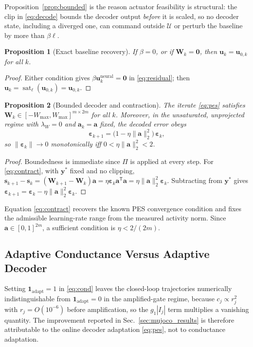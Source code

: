 \documentclass[letterpaper,10pt,conference]{IEEEtran}
\newcommand{\T}{^{\mathsf T}}
\newcommand{\sat}{\operatorname{sat}}
\newtheorem{proposition}{Proposition}
\begin{document}
Proposition~\ref{prop:bounded} is the reason actuator feasibility is
structural: the clip in \eqref{eq:decode} bounds the decoder output
\emph{before} it is scaled, so no decoder state, including a diverged one,
can command outside $\mathcal U$ or perturb the baseline by more than
$\beta\bm\ell$.

\begin{proposition}[Exact baseline recovery]
\label{prop:recovery}
If $\beta=0$, or if $\bm W_k=\bm 0$, then $\bm u_k=\bm u_{0,k}$ for all
$k$.
\end{proposition}
\begin{proof}
Either condition gives $\beta\bm u^{\mathrm{neural}}_k=\bm 0$ in
\eqref{eq:residual}; then $\bm u_k=\sat_{\bm\ell}(\bm u_{0,k})=\bm u_{0,k}$.
\end{proof}

\begin{proposition}[Bounded decoder and contraction]
\label{prop:pes}
The iterate \eqref{eq:pes} satisfies
$\bm W_k\in[-W_{\max},W_{\max}]^{m\times2m}$ for all $k$. Moreover, in the
unsaturated, unprojected regime with $\lambda_W=0$ and $\bm a_k=\bm a$
fixed, the decoded error obeys
\begin{equation}
    \bm\varepsilon_{k+1}
    =\big(1-\eta\|\bm a\|_2^{2}\big)\,\bm\varepsilon_k ,
    \label{eq:contract}
\end{equation}
so $\|\bm\varepsilon_k\|\to0$ monotonically iff
$0<\eta\|\bm a\|_2^{2}<2$.
\end{proposition}
\begin{proof}
Boundedness is immediate since $\Pi$ is applied at every step. For
\eqref{eq:contract}, with $\bm y^{*}$ fixed and no clipping,
$\bm s_{k+1}-\bm s_k=(\bm W_{k+1}-\bm W_k)\bm a
=\eta\bm\varepsilon_k\bm a\T\bm a=\eta\|\bm a\|_2^2\bm\varepsilon_k$.
Subtracting from $\bm y^{*}$ gives
$\bm\varepsilon_{k+1}=\bm\varepsilon_k-\eta\|\bm a\|_2^2\bm\varepsilon_k$.
\end{proof}

Equation \eqref{eq:contract} recovers the known PES convergence condition
\cite{voelker2015pes} and fixes the admissible learning-rate range from the
measured activity norm. Since $\bm a\in[0,1]^{2m}$, a sufficient condition
is $\eta<2/(2m)$.

\subsection{Adaptive Conductance Versus Adaptive Decoder}

Setting $\mathbf 1_{\mathrm{adapt}}=1$ in \eqref{eq:cond} leaves the
closed-loop trajectories numerically indistinguishable from
$\mathbf 1_{\mathrm{adapt}}=0$ in the amplified-gate regime, because
$c_j\propto r_j^{2}$ with $r_j=O(10^{-6})$ before amplification, so the
$g_1|I_j|$ term multiplies a vanishing quantity. The improvement reported
in Sec.~\ref{sec:mujoco_results} is therefore attributable to the online
decoder adaptation \eqref{eq:pes}, not to conductance adaptation.
\end{document}
